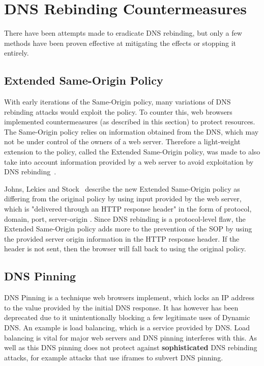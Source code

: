 \chapter{DNS Rebinding Countermeasures}

There have been attempts made to eradicate DNS rebinding, but only
a few methods have been proven effective at mitigating the effects
or stopping it entirely.

\section{Extended Same-Origin Policy}

With early iterations of the Same-Origin policy, many variations of
DNS rebinding attacks would exploit the policy. To counter this, web
browsers implemented countermeasures (as described in this section) to
protect resources. The Same-Origin policy relies on information
obtained from the DNS, which may not be under control of the owners
of a web server. Therefore a light-weight extension to the policy,
called the Extended Same-Origin policy, was made to also take into
account information provided by a web server to avoid exploitation by
DNS rebinding~\cite{johns2013eradicating}.

\vspace{0.5cm}

Johns, Lekies and Stock~\cite{johns2013eradicating} describe the new Extended
Same-Origin policy as differing from the original policy by using input
provided by the web server, which is "delivered through an HTTP response
header" in the form of { protocol, domain, port, server-origin }. Since DNS
rebinding is a protocol-level flaw, the Extended Same-Origin policy adds more
to the prevention of the SOP by using the provided server origin information in
the HTTP response header. If the header is not sent, then the browser will
fall back to using the original policy.

\section{DNS Pinning}

DNS Pinning is a technique web browsers implement, which locks an IP
address to the value provided by the initial DNS response. It has
however has been deprecated due to it unintentionally blocking a
few legitimate uses of Dynamic DNS. An example is load balancing,
which is a service provided by DNS. Load balancing is vital for
major web servers and DNS pinning interferes with this.
As well as this DNS pinning does not protect against \textbf{sophisticated}
DNS rebinding attacks, for example attacks that use iframes to subvert DNS
pinning.

